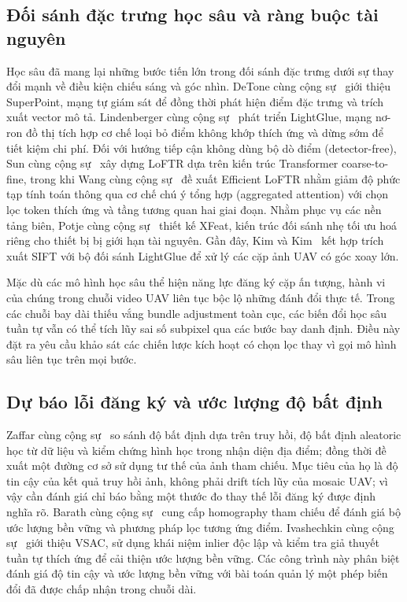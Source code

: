\subsection{Đối sánh đặc trưng học sâu và ràng buộc tài nguyên}
Học sâu đã mang lại những bước tiến lớn trong đối sánh đặc trưng dưới sự thay đổi mạnh về điều kiện chiếu sáng và góc nhìn. DeTone cùng cộng sự~\cite{detone2018} giới thiệu SuperPoint, mạng tự giám sát để đồng thời phát hiện điểm đặc trưng và trích xuất vector mô tả. Lindenberger cùng cộng sự~\cite{lindenberger2023} phát triển LightGlue, mạng nơ-ron đồ thị tích hợp cơ chế loại bỏ điểm không khớp thích ứng và dừng sớm để tiết kiệm chi phí. Đối với hướng tiếp cận không dùng bộ dò điểm (detector-free), Sun cùng cộng sự~\cite{sun2021} xây dựng LoFTR dựa trên kiến trúc Transformer coarse-to-fine, trong khi Wang cùng cộng sự~\cite{wang2024} đề xuất Efficient LoFTR nhằm giảm độ phức tạp tính toán thông qua cơ chế chú ý tổng hợp (aggregated attention) với chọn lọc token thích ứng và tầng tương quan hai giai đoạn. Nhằm phục vụ các nền tảng biên, Potje cùng cộng sự~\cite{xfeat2024} thiết kế XFeat, kiến trúc đối sánh nhẹ tối ưu hoá riêng cho thiết bị bị giới hạn tài nguyên. Gần đây, Kim và Kim~\cite{kim2025} kết hợp trích xuất SIFT với bộ đối sánh LightGlue để xử lý các cặp ảnh UAV có góc xoay lớn.

Mặc dù các mô hình học sâu thể hiện năng lực đăng ký cặp ấn tượng, hành vi của chúng trong chuỗi video UAV liên tục bộc lộ những đánh đổi thực tế. Trong các chuỗi bay dài thiếu vắng bundle adjustment toàn cục, các biến đổi học sâu tuần tự vẫn có thể tích lũy sai số subpixel qua các bước bay danh định. Điều này đặt ra yêu cầu khảo sát các chiến lược kích hoạt có chọn lọc thay vì gọi mô hình sâu liên tục trên mọi bước.

\subsection{Dự báo lỗi đăng ký và ước lượng độ bất định}
Zaffar cùng cộng sự~\cite{zaffar2024} so sánh độ bất định dựa trên truy hồi, độ bất định aleatoric học từ dữ liệu và kiểm chứng hình học trong nhận diện địa điểm; đồng thời đề xuất một đường cơ sở sử dụng tư thế của ảnh tham chiếu. Mục tiêu của họ là độ tin cậy của kết quả truy hồi ảnh, không phải drift tích lũy của mosaic UAV; vì vậy cần đánh giá chỉ báo bằng một thước đo thay thế lỗi đăng ký được định nghĩa rõ. Barath cùng cộng sự~\cite{barath2023} cung cấp homography tham chiếu để đánh giá bộ ước lượng bền vững và phương pháp lọc tương ứng điểm. Ivashechkin cùng cộng sự~\cite{ivashechkin2021} giới thiệu VSAC, sử dụng khái niệm inlier độc lập và kiểm tra giả thuyết tuần tự thích ứng để cải thiện ước lượng bền vững. Các công trình này phân biệt đánh giá độ tin cậy và ước lượng bền vững với bài toán quản lý một phép biến đổi đã được chấp nhận trong chuỗi dài.


